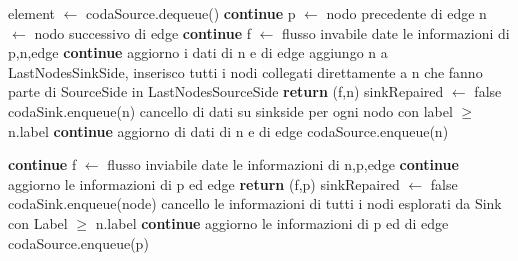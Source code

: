 \documentclass{article}
\begin{document}
\begin{algorithm}
\begin{algorithmic}[1]
\STATE element $\leftarrow$ codaSource.dequeue()
\STATE \textbf{continue}
\ENDIF
{}
\STATE p $\leftarrow$ nodo precedente di edge
\STATE n $\leftarrow$ nodo successivo di edge
\STATE \textbf{continue}
\ELSE {}
\STATE f $\leftarrow$  flusso invabile date le informazioni di p,n,edge
\STATE \textbf{continue}
\ENDIF
\STATE aggiorno i dati di n e di edge
\STATE aggiungo n a LastNodesSinkSide, inserisco tutti i nodi collegati direttamente a n che fanno parte di SourceSide in LastNodesSourceSide
\STATE \textbf{return} (f,n)
\ENDIF
\ENDIF
{}
\STATE sinkRepaired $\leftarrow$ false
\STATE codaSink.enqueue(n)
\ENDFOR
\STATE cancello di dati su sinkside per ogni nodo con label $\ge$ n.label
\STATE \textbf{continue}
\ENDIF
\STATE aggiorno di dati di n e di edge
\STATE codaSource.enqueue(n)
\end{algorithmic}
\end{algorithm}
\newpage
\begin{algorithm}
\begin{algorithmic}
\STATE\textbf{continue}
\ELSE
\STATE f $\leftarrow$ flusso inviabile date le informazioni di n,p,edge
\STATE \textbf{continue}
\ENDIF
\STATE aggiorno le informazioni di p ed edge
\STATE \textbf{return } (f,p)
\ENDIF
\ENDIF
{}
\STATE sinkRepaired $\leftarrow$ false
\STATE codaSink.enqueue(node)
\ENDFOR
\STATE cancello le informazioni di tutti i nodi esplorati da Sink con Label $\ge $ n.label
\STATE\textbf{continue}
\ENDIF
\STATE aggiorno le informazioni di p ed di edge
\STATE codaSource.enqueue(p)
\ENDIF
\ENDFOR
\ENDIF
{}
\end{algorithmic}
\end{algorithm}
\end{document}
